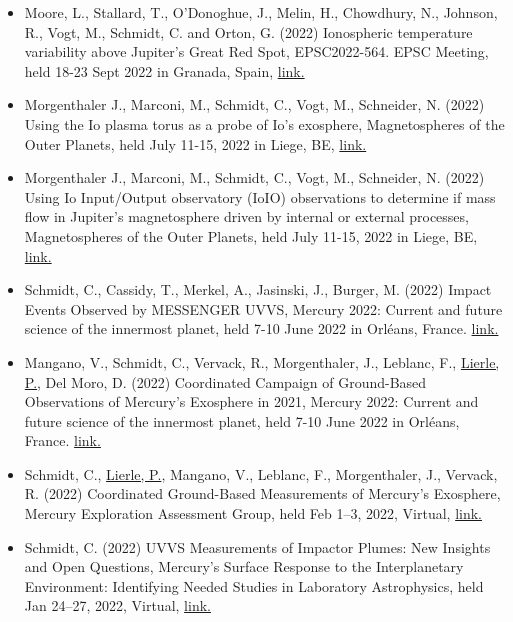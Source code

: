 \documentclass[12pt]{report}
\begin{document}
 \begin{itemize} \itemsep -2pt %
\item Moore, L., Stallard, T., O'Donoghue, J., Melin, H., Chowdhury, N., Johnson, R., Vogt, M.,  Schmidt, C. and Orton, G. (2022) Ionospheric temperature variability above Jupiter's Great Red Spot, EPSC2022-564. EPSC Meeting, held 18-23 Sept 2022 in Granada, Spain, \href{https://meetingorganizer.copernicus.org/epsc2022/sessionprogramme}{link.}
   \item Morgenthaler J., Marconi, M., Schmidt, C., Vogt, M., Schneider, N. (2022) Using the Io plasma torus as a probe of Io's exosphere,  Magnetospheres of the Outer Planets, held July 11-15, 2022 in Liege, BE, \href{ https://www.mop.uliege.be/}{link.}
   \item Morgenthaler J., Marconi, M., Schmidt, C., Vogt, M., Schneider, N. (2022)  Using Io Input/Output observatory (IoIO) observations to determine if mass flow in Jupiter's magnetosphere driven by internal or external processes,  Magnetospheres of the Outer Planets, held July 11-15, 2022 in Liege, BE, \href{ https://www.mop.uliege.be/}{link.}
  \item Schmidt, C., Cassidy, T., Merkel, A., Jasinski, J., Burger, M. (2022) Impact Events Observed by MESSENGER UVVS, Mercury 2022: Current and future science of the innermost planet, held 7-10 June 2022 in Orl\'eans, France. \href{https://mercury2020.ias.u-psud.fr/main_1st.php}{link.} 
  \item Mangano, V., Schmidt, C., Vervack, R., Morgenthaler, J., Leblanc, F., \underline{Lierle, P.}, Del Moro, D. (2022) Coordinated Campaign of Ground-Based Observations of Mercury’s Exosphere in 2021, Mercury 2022: Current and future science of the innermost planet, held 7-10 June 2022 in Orl\'eans, France. \href{https://mercury2020.ias.u-psud.fr/main_1st.php}{link.} 
  \item Schmidt, C., \underline{Lierle, P.}, Mangano, V., Leblanc, F., Morgenthaler, J., Vervack, R. (2022) Coordinated Ground-Based Measurements of Mercury’s Exosphere, Mercury Exploration Assessment Group, held Feb 1–3, 2022, Virtual, \href{https://www.hou.usra.edu/meetings/mexagfebruary2022/eposter/9007.pdf}{link.} 
  \item Schmidt, C. (2022) UVVS Measurements of Impactor Plumes: New Insights and Open Questions, Mercury’s Surface Response to the Interplanetary Environment: Identifying Needed Studies in Laboratory Astrophysics, held Jan 24–27, 2022, Virtual, \href{https://meeting.psi.edu/mercurylab2022/}{link.} 

\end{itemize}
\end{document}
